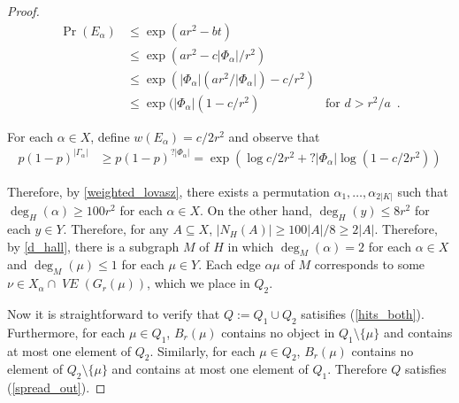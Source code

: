 \documentclass{patmorin}
\DeclareMathOperator{\VE}{\mathit{VE}}
\begin{document}
\begin{proof}
  \begin{align*}
      \Pr(E_\alpha)
      & \le \exp(ar^2-bt) \\
      & \le \exp(ar^2-c|\Phi_\alpha|/r^2) \\
      & \le \exp(|\Phi_\alpha|(ar^2/|\Phi_\alpha|)-c/r^2) \\
      & \le \exp(|\Phi_\alpha|(1-c/r^2) & \text{for $d>r^2/a$} \enspace .
  \end{align*}

  For each $\alpha\in X$, define $w(E_\alpha)=c/2r^2$ and observe that
  \begin{align*}
    p(1-p)^{|\Gamma_\alpha|}
    & \ge  p(1-p)^{?|\Phi_\alpha|} = \exp(\log c/2r^2 + ?|\Phi_\alpha|\log(1-c/2r^2))
  \end{align*}

  Therefore, by \cref{weighted_lovasz}, there exists a permutation $\alpha_1,\ldots,\alpha_{2|K|}$ such that $\deg_H(\alpha)\ge 100r^2$ for each $\alpha\in X$.  On the other hand, $\deg_{H}(y)\le 8r^2$ for each $y\in Y$.  Therefore, for any $A\subseteq X$, $|N_H(A)|\ge 100|A|/8 \ge 2|A|$.  Therefore, by \cref{d_hall}, there is a subgraph $M$ of $H$ in which $\deg_M(\alpha)=2$ for each $\alpha\in X$ and $\deg_M(\mu)\le 1$ for each $\mu\in Y$. Each edge $\alpha\mu$ of $M$ corresponds to some $\nu\in X_\alpha\cap\VE(G_r(\mu))$, which we place in $Q_2$.

  Now it is straightforward to verify that $Q:=Q_1\cup Q_2$ satisifies (\ref{hits_both}).  Furthermore, for each $\mu\in Q_1$, $B_r(\mu)$ contains no object in $Q_1\setminus\{\mu\}$ and contains at most one element of $Q_2$.  Similarly, for each $\mu\in Q_2$, $B_r(\mu)$ contains no element of $Q_2\setminus\{\mu\}$ and contains at most one element of $Q_1$.  Therefore $Q$ satisfies (\ref{spread_out}).
\end{proof}



\newpage
\end{document}

